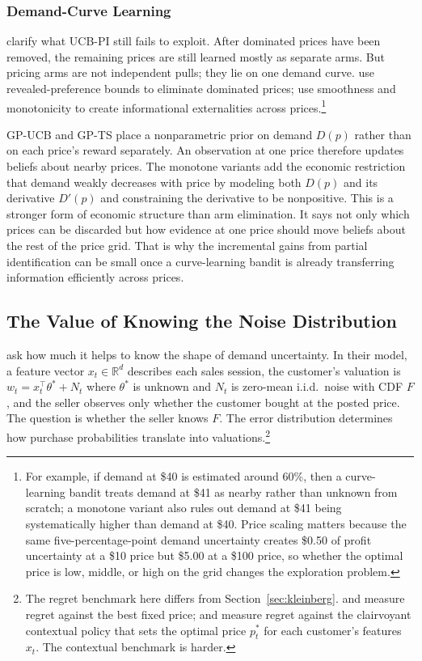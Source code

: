 \subsubsection{Demand-Curve Learning}

\citet{Weaver2025} clarify what UCB-PI still fails to exploit. After dominated prices have been removed, the remaining prices are still learned mostly as separate arms. But pricing arms are not independent pulls; they lie on one demand curve. \citet{Misra2019} use revealed-preference bounds to eliminate dominated prices; \citet{Weaver2025} use smoothness and monotonicity to create informational externalities across prices.\footnote{For example, if demand at \$40 is estimated around 60\%, then a curve-learning bandit treats demand at \$41 as nearby rather than unknown from scratch; a monotone variant also rules out demand at \$41 being systematically higher than demand at \$40. Price scaling matters because the same five-percentage-point demand uncertainty creates \$0.50 of profit uncertainty at a \$10 price but \$5.00 at a \$100 price, so whether the optimal price is low, middle, or high on the grid changes the exploration problem.}

GP-UCB and GP-TS place a nonparametric prior on demand $D(p)$ rather than on each price's reward separately. An observation at one price therefore updates beliefs about nearby prices. The monotone variants add the economic restriction that demand weakly decreases with price by modeling both $D(p)$ and its derivative $D'(p)$ and constraining the derivative to be nonpositive. This is a stronger form of economic structure than arm elimination. It says not only which prices can be discarded but how evidence at one price should move beliefs about the rest of the price grid. That is why the incremental gains from partial identification can be small once a curve-learning bandit is already transferring information efficiently across prices.

\subsection{The Value of Knowing the Noise Distribution}
\label{sec:xu}

\citet{Xu2021} ask how much it helps to know the shape of demand uncertainty. In their model, a feature vector $x_t \in \mathbb{R}^d$ describes each sales session, the customer's valuation is $w_t = x_t^\top \theta^* + N_t$ where $\theta^*$ is unknown and $N_t$ is zero-mean i.i.d.\ noise with CDF $F$, and the seller observes only whether the customer bought at the posted price. The question is whether the seller knows $F$. The error distribution determines how purchase probabilities translate into valuations.\footnote{The regret benchmark here differs from Section~\ref{sec:kleinberg}. \citet{Kleinberg2003} and \citet{Broder2012} measure regret against the best fixed price; \citet{Xu2021} and \citet{Liu2024strategic} measure regret against the clairvoyant contextual policy that sets the optimal price $p_t^*$ for each customer's features $x_t$. The contextual benchmark is harder.}

